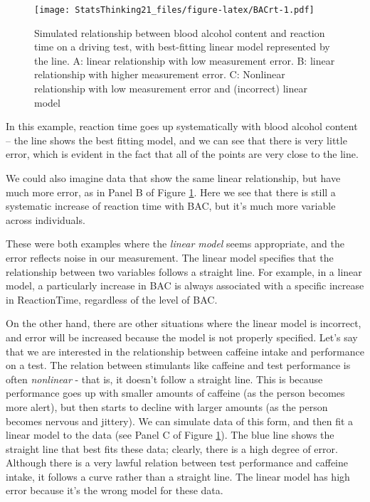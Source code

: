 \documentclass[12pt,]{book}
\theoremstyle{definition}
\theoremstyle{definition}
\theoremstyle{definition}
\theoremstyle{remark}
\begin{document}
\begin{figure}
\centering
\texttt{[image: StatsThinking21\_files/figure-latex/BACrt-1.pdf]}
\caption{\label{fig:BACrt}Simulated relationship between blood alcohol content and reaction time on a driving test, with best-fitting linear model represented by the line. A: linear relationship with low measurement error. B: linear relationship with higher measurement error. C: Nonlinear relationship with low measurement error and (incorrect) linear model}
\end{figure}

In this example, reaction time goes up systematically with blood alcohol content -- the line shows the best fitting model, and we can see that there is very little error, which is evident in the fact that all of the points are very close to the line.

We could also imagine data that show the same linear relationship, but have much more error, as in Panel B of Figure \ref{fig:BACrt}. Here we see that there is still a systematic increase of reaction time with BAC, but it's much more variable across individuals.

These were both examples where the \emph{linear model} seems appropriate, and the error reflects noise in our measurement. The linear model specifies that the relationship between two variables follows a straight line. For example, in a linear model, a particularly increase in BAC is always associated with a specific increase in ReactionTime, regardless of the level of BAC.

On the other hand, there are other situations where the linear model is incorrect, and error will be increased because the model is not properly specified. Let's say that we are interested in the relationship between caffeine intake and performance on a test. The relation between stimulants like caffeine and test performance is often \emph{nonlinear} - that is, it doesn't follow a straight line. This is because performance goes up with smaller amounts of caffeine (as the person becomes more alert), but then starts to decline with larger amounts (as the person becomes nervous and jittery). We can simulate data of this form, and then fit a linear model to the data (see Panel C of Figure \ref{fig:BACrt}). The blue line shows the straight line that best fits these data; clearly, there is a high degree of error. Although there is a very lawful relation between test performance and caffeine intake, it follows a curve rather than a straight line. The linear model has high error because it's the wrong model for these data.
\end{document}
